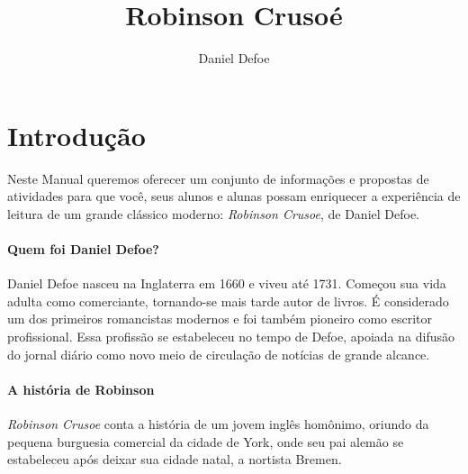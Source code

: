 \documentclass[12pt]{extarticle}
\begin{document}
\newcommand{\AutorLivro}{Daniel Defoe}
\newcommand{\TituloLivro}{Robinson Crusoé}
\newcommand{\Tema}{Ficção, mistério e fantasia}
\newcommand{\Genero}{Romance}
\newcommand{\imagemCapa}{./images/PNLD0013-01.png}
\newcommand{\issnppub}{---}
\newcommand{\issnepub}{---}
\newcommand{\colaborador}{\textbf{Iuri Pereira} é uma pessoa incrível e vai fazer um bom serviço.}


\title{\TituloLivro}
\author{\AutorLivro}
\def\authornotes{\colaborador}

\date{}
\maketitle


\begin{abstract}
\lipsum[1-3]
\end{abstract}

\tableofcontents
{}\baselineskip\par


\section{Introdução}

Neste Manual queremos oferecer um conjunto de informações e propostas de
atividades para que você, seus alunos e alunas possam enriquecer a
experiência de leitura de um grande clássico moderno: \emph{Robinson
Crusoe}, de Daniel Defoe.

\paragraph{Quem foi Daniel Defoe?}
Daniel Defoe nasceu na Inglaterra em 1660 e viveu até 1731. Começou sua
vida adulta como comerciante, tornando-se mais tarde autor de livros. É
considerado um dos primeiros romancistas modernos e foi também pioneiro
como escritor profissional. Essa profissão se estabeleceu no tempo de
Defoe, apoiada na difusão do jornal diário como novo meio de circulação
de notícias de grande alcance.


\paragraph{A história de Robinson}
\emph{Robinson Crusoe} conta a história de um jovem inglês homônimo,
oriundo da pequena burguesia comercial da cidade de York, onde seu pai
alemão se estabeleceu após deixar sua cidade natal, a nortista Bremen.
\end{document}
